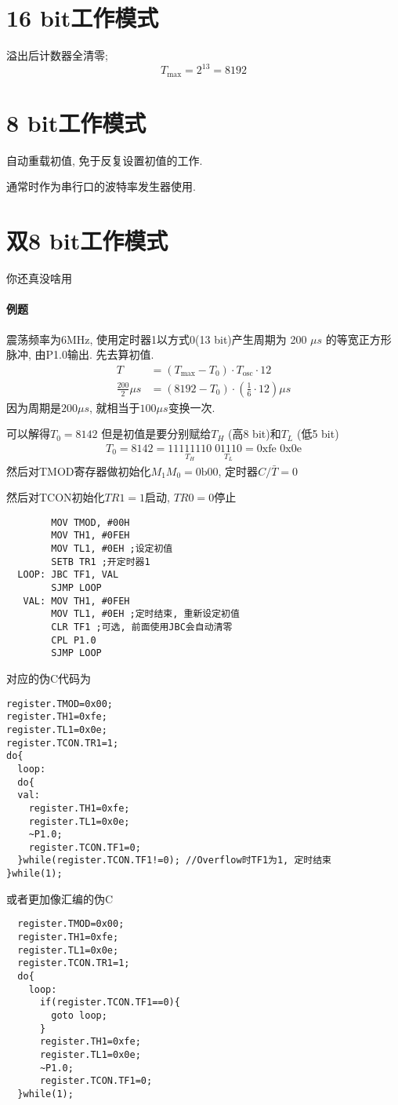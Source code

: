 \documentclass[a4paper]{report}
\begin{document}
\section{16 bit工作模式}
溢出后计数器全清零; 
$$T_{\max}=2^{13}=8192$$
\section{8 bit工作模式}
自动重载初值, 免于反复设置初值的工作. 

通常时作为串行口的波特率发生器使用. 
\section{双8 bit工作模式}
你还真没啥用

\paragraph{例题}震荡频率为6MHz, 使用定时器1以方式0(13 bit)产生周期为 200 $\mu s$ 的等宽正方形脉冲, 由P1.0输出. 
先去算初值. 
\begin{align*}
  T&=(T_{\max}-T_0)\cdot T_{\text{osc}}\cdot 12\\
  \frac{200}{2}\mu s&=(8192-T_0)\cdot (\frac{1}{6}\cdot 12)\mu s
\end{align*}
因为周期是$200\mu s$, 就相当于$100\mu s$变换一次. 

可以解得$T_0=8142$
但是初值是要分别赋给$T_H$ (高8 bit)和$T_L$ (低5 bit)
\begin{align*}
  T_0=8142=\underset{T_H}{11111110}\; \underset{T_L}{01110}=\text{0xfe 0x0e}
\end{align*}
然后对TMOD寄存器做初始化$M_1M_0=\text{0b00}$, 定时器$C/\bar{T}=0$

然后对TCON初始化$TR1=1$启动, $TR0=0$停止

\begin{verbatim}
        MOV TMOD, #00H
        MOV TH1, #0FEH
        MOV TL1, #0EH ;设定初值
        SETB TR1 ;开定时器1
  LOOP: JBC TF1, VAL
        SJMP LOOP
   VAL: MOV TH1, #0FEH
        MOV TL1, #0EH ;定时结束, 重新设定初值
        CLR TF1 ;可选, 前面使用JBC会自动清零
        CPL P1.0
        SJMP LOOP
\end{verbatim}
对应的伪C代码为
\begin{verbatim}
register.TMOD=0x00;
register.TH1=0xfe;
register.TL1=0x0e;
register.TCON.TR1=1;
do{
  loop:
  do{
  val:
    register.TH1=0xfe;
    register.TL1=0x0e;
    ~P1.0;
    register.TCON.TF1=0;
  }while(register.TCON.TF1!=0); //Overflow时TF1为1, 定时结束
}while(1);
\end{verbatim}
或者更加像汇编的伪C
\begin{verbatim}
  register.TMOD=0x00;
  register.TH1=0xfe;
  register.TL1=0x0e;
  register.TCON.TR1=1;
  do{
    loop:
      if(register.TCON.TF1==0){
        goto loop;
      }
      register.TH1=0xfe;
      register.TL1=0x0e;
      ~P1.0;
      register.TCON.TF1=0;
  }while(1);
\end{verbatim}
\end{document}
